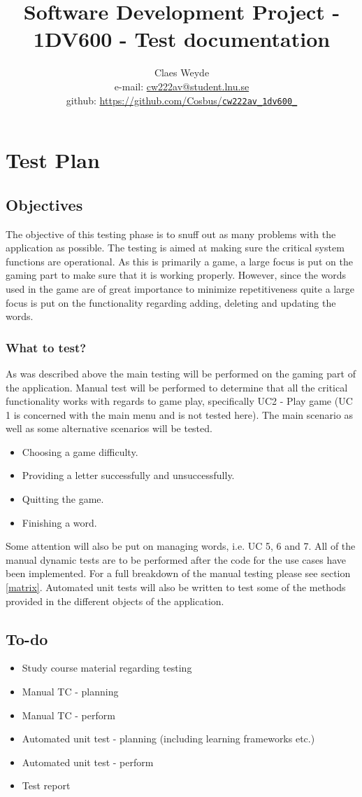 \documentclass[12pt, letterpaper]{article}
\title{Software Development Project - 1DV600 - Test documentation}
\author{Claes Weyde \\ 
	e-mail: \href{mailto:cw222av@student.lnu.se}{cw222av@student.lnu.se} \\
	github: \href{https://github.com/Cosbus/cw222av_1dv600_}{https://github.com/Cosbus/\texttt{cw222av\_1dv600\_}}}
\begin{document}
\maketitle
\newpage
\tableofcontents{}
\newpage

\section{Test Plan}

\subsection{Objectives}
The objective of this testing phase is to snuff out as many problems with the application as possible. The testing is aimed at making sure the critical system functions are operational. As this is primarily a game, a large focus is put on the gaming part to make sure that it is working properly. However, since the words used in the game are of great importance to minimize repetitiveness quite a large focus is put on the functionality regarding adding, deleting and updating the words.
\subsubsection{What to test?}
As was described above the main testing will be performed on the gaming part of the application. Manual test will be performed to determine that all the critical functionality works with regards to game play, specifically UC2 - Play game (UC 1 is concerned with the main menu and is not tested here). The main scenario as well as some alternative scenarios will be tested.
\begin{itemize}
	\item Choosing a game difficulty.
	\item Providing a letter successfully and unsuccessfully.
	\item Quitting the game.
	\item Finishing a word.
\end{itemize}
Some attention will also be put on managing words, i.e. UC 5, 6 and 7. All of the manual dynamic tests are to be performed after the code for the use cases have been implemented. For a full breakdown of the manual testing please see section \ref{matrix}.
\newline
\newline
Automated unit tests will also be written to test some of the methods provided in the different objects of the application.
\subsection{To-do}
\begin{itemize}
	\item Study course material regarding testing
	\item Manual TC - planning
	\item Manual TC - perform
	\item Automated unit test - planning (including learning frameworks etc.)
	\item Automated unit test - perform
	\item Test report
\end{itemize}
\end{document}
